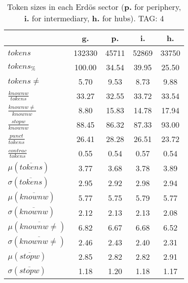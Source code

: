 \begin{table}[h!]
\begin{center}
\begin{tabular}{| l || c | c | c | c |}\hline
 & {\bf g.} & {\bf p.} & {\bf i.} & {\bf h.} \\\hline\hline
$tokens$ & 132330  & 45711  & 52869  & 33750 \\
$tokens_{\%}$ & 100.00  & 34.54  & 39.95  & 25.50 \\
$tokens \neq$ & 5.70  & 9.53  & 8.73  & 9.88 \\\hline
$\frac{knownw}{tokens}$ & 33.27  & 32.55  & 33.72  & 33.54 \\
$\frac{knownw \neq}{knownw}$ & 8.80  & 15.83  & 14.78  & 17.94 \\\hline
$\frac{stopw}{knownw}$ & 88.45  & 86.32  & 87.33  & 93.00 \\
$\frac{punct}{tokens}$ & 26.41  & 28.28  & 26.51  & 23.72 \\
$\frac{contrac}{tokens}$ & 0.55  & 0.54  & 0.57  & 0.54 \\\hline\hline
$\mu(\overline{tokens})$ & 3.77  & 3.68  & 3.78  & 3.89 \\
$\sigma(\overline{tokens})$ & 2.95  & 2.92  & 2.98  & 2.94 \\\hline
$\mu(\overline{knownw})$ & 5.77  & 5.75  & 5.79  & 5.77 \\
$\sigma(\overline{knownw})$ & 2.12  & 2.13  & 2.13  & 2.08 \\\hline
$\mu(\overline{knownw \neq})$ & 6.82  & 6.67  & 6.68  & 6.52 \\
$\sigma(\overline{knownw \neq})$ & 2.46  & 2.43  & 2.40  & 2.31 \\\hline
$\mu(\overline{stopw})$ & 2.85  & 2.82  & 2.82  & 2.91 \\
$\sigma(\overline{stopw})$ & 1.18  & 1.20  & 1.18  & 1.17 \\\hline
\end{tabular}
\caption{Token sizes in each Erd\"os sector ({{\bf p.}} for periphery, {{\bf i.}} for intermediary, {{\bf h.}} for hubs). TAG: 4}
\end{center}
\end{table}